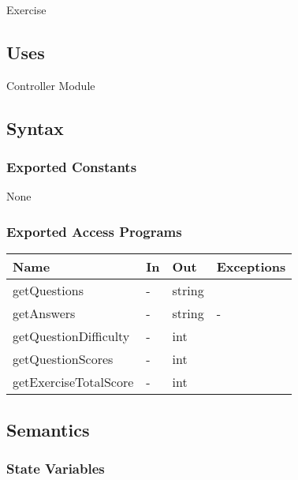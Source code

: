 \documentclass[12pt, titlepage]{article}
\begin{document}
Exercise

\subsection{Uses}

Controller Module

\subsection{Syntax}

\subsubsection{Exported Constants}

None

\subsubsection{Exported Access Programs}


\begin{center}
\begin{tabular}{p{4cm} p{3cm} p{3cm} p{4cm}}
\hline
\textbf{Name} & \textbf{In} & \textbf{Out} & \textbf{Exceptions} \\
\hline
getQuestions & - & string & \\
getAnswers & - & string & - \\
getQuestionDifficulty & - & int &  \\
getQuestionScores & - & int & \\
getExerciseTotalScore & - & int & \\
\hline
\end{tabular}
\end{center}

\subsection{Semantics}

\subsubsection{State Variables}
\end{document}
